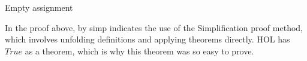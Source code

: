 \begin{isabellebody}
{  Empty assignment \color{black}%
}%
\endisatagproof
{\isafoldproof}%
%
\isadelimproof
%
\endisadelimproof
%
\begin{isamarkuptext}%
In the proof above, {\color{red} by simp} indicates the use of the Simplification proof method, 
which involves unfolding definitions and applying theorems directly. HOL has $True$ as a theorem,
which is why this theorem was so easy to prove.%
\end{isamarkuptext}\isamarkuptrue%
%
\isadelimtheory
%
\endisadelimtheory
%
\isatagtheory
%
\endisatagtheory
{\isafoldtheory}%
%
\isadelimtheory
%
\endisadelimtheory
%
\end{isabellebody}%
\endinput
